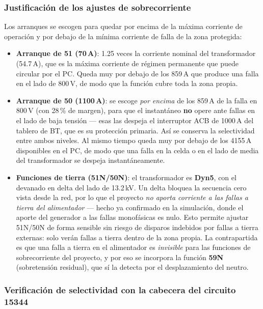 \documentclass[11pt,a4paper]{article}
\begin{document}
\subsubsection{Justificaci\'on de los ajustes de sobrecorriente}

Los arranques se escogen para quedar por encima de la m\'axima corriente de operaci\'on y por debajo de la m\'inima corriente de falla de la zona protegida:

\begin{itemize}
\item \textbf{Arranque de 51 (70\,A)}: 1.25 veces la corriente nominal del transformador (54.7\,A), que es la m\'axima corriente de r\'egimen permanente que puede circular por el PC. Queda muy por debajo de los 859\,A que produce una falla en el lado de 800\,V, de modo que la funci\'on cubre toda la zona propia.
\item \textbf{Arranque de 50 (1100\,A)}: se escoge \emph{por encima} de los 859\,A de la falla en 800\,V (con 28\,\% de margen), para que el instant\'aneo \textbf{no} opere ante fallas en el lado de baja tensi\'on --- esas las despeja el interruptor ACB de 1000\,A del tablero de BT, que es su protecci\'on primaria. As\'i se conserva la selectividad entre ambos niveles. Al mismo tiempo queda muy por debajo de los 4155\,A disponibles en el PC, de modo que una falla en la celda o en el lado de media del transformador se despeja instant\'aneamente.
\item \textbf{Funciones de tierra (51N/50N)}: el transformador es \textbf{Dyn5}, con el devanado en delta del lado de 13.2\,kV. Un delta bloquea la secuencia cero vista desde la red, por lo que el proyecto \emph{no aporta corriente a las fallas a tierra del alimentador} --- hecho ya confirmado en la simulaci\'on, donde el aporte del generador a las fallas monof\'asicas es nulo. Esto permite ajustar 51N/50N de forma sensible sin riesgo de disparos indebidos por fallas a tierra externas: solo ver\'an fallas a tierra dentro de la zona propia. La contrapartida es que una falla a tierra en el alimentador es \emph{invisible} para las funciones de sobrecorriente del proyecto, y por eso se incorpora la funci\'on \textbf{59N} (sobretensi\'on residual), que s\'i la detecta por el desplazamiento del neutro.
\end{itemize}

\subsubsection{Verificaci\'on de selectividad con la cabecera del circuito 15344}
\end{document}
